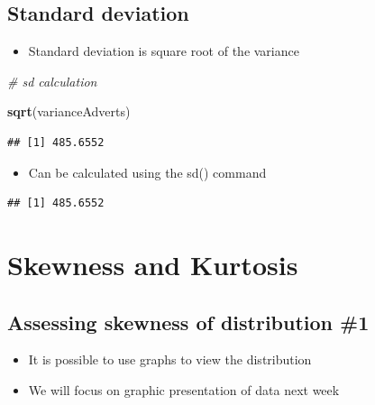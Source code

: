 \documentclass[
]{book}
\newenvironment{Shaded}{\begin{snugshade}}{\end{snugshade}}
\newcommand{\CommentTok}[1]{\textcolor[rgb]{0.56,0.35,0.01}{\textit{#1}}}
\newcommand{\KeywordTok}[1]{\textcolor[rgb]{0.13,0.29,0.53}{\textbf{#1}}}
\newcommand{\NormalTok}[1]{#1}
\newcommand{\OperatorTok}[1]{\textcolor[rgb]{0.81,0.36,0.00}{\textbf{#1}}}
\providecommand{\tightlist}{%
  \setlength{\itemsep}{0pt}\setlength{\parskip}{0pt}}
\begin{document}
\hypertarget{standard-deviation}{%
\subsection{Standard deviation}\label{standard-deviation}}

\begin{itemize}
\tightlist
\item
  Standard deviation is square root of the variance
\end{itemize}

\begin{Shaded}
\begin{Highlighting}[]
\CommentTok{# sd calculation}


\KeywordTok{sqrt}\NormalTok{(varianceAdverts)}
\end{Highlighting}
\end{Shaded}

\begin{verbatim}
## [1] 485.6552
\end{verbatim}

\begin{itemize}
\tightlist
\item
  Can be calculated using the sd() command
\end{itemize}

\begin{Shaded}
\end{Shaded}

\begin{verbatim}
## [1] 485.6552
\end{verbatim}

\hypertarget{skewness-and-kurtosis}{%
\section{Skewness and Kurtosis}\label{skewness-and-kurtosis}}

\hypertarget{assessing-skewness-of-distribution-1}{%
\subsection{Assessing skewness of distribution \#1}\label{assessing-skewness-of-distribution-1}}

\begin{itemize}
\tightlist
\item
  It is possible to use graphs to view the distribution
\item
  We will focus on graphic presentation of data next week
\end{itemize}
\end{document}
